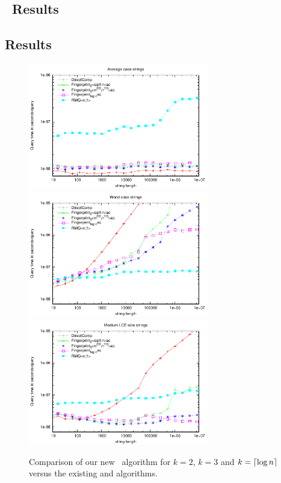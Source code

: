 \documentclass[a4]{article}
\begin{document}
\subsection{\fprintk\ Results}

\fi %

\ifarticle
\subsection{Results}
\fi %

\begin{figure}[tp]
    \begin{center}
        \includegraphics[width=0.7\textwidth,type=pdf,ext=.pdf,read=.pdf]{../src/results/length-article-rand10.plt}
        \includegraphics[width=0.7\textwidth,type=pdf,ext=.pdf,read=.pdf]{../src/results/length-article-alla.plt}
        \includegraphics[width=0.7\textwidth,type=pdf,ext=.pdf,read=.pdf]{../src/results/length-article-repeat-pow.plt}
    \end{center}
    \caption{\label{fig:test-fingerprint}Comparison of our new \fprintk\ algorithm for $k=2$, $k=3$ and $k=\lceil\log n\rceil$ versus the existing  and  algorithms.}
\end{figure}
\end{document}
